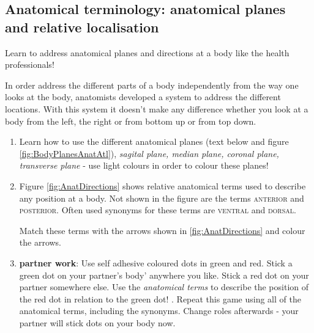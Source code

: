 \clearpage 	 \areaset[0cm]{16cm}{26.5cm} 
\subsection{Anatomical terminology: anatomical planes and relative localisation}\label{ssec:OrientierungKoerper}
 Learn to address anatomical planes and directions at a body like the health professionals! 
 
  In order address the different parts of a body independently from the way one looks at the body, anatomists developed a system to address the different locations. With this system it doesn't make any difference whether you look at a body from the left, the right or from bottom up or from top down.

	\begin{enumerate}[itemsep=1.5em, leftmargin=*]   
		\item Learn how to use the different anatomical planes (text below and figure \ref{fig:BodyPlanesAnatAtl}), \textit{sagital plane, median plane, coronal plane, transverse plane} - use light colours in order to colour these planes! 

		\item  Figure \ref{fig:AnatDirections} shows relative anatomical terms used to describe any position at a body. Not shown in the figure are the terms \textsc{anterior} and \textsc{posterior}. Often used synonyms for these terms are \textsc{ventral} and \textsc{dorsal}.
		
		Match these terms with the arrows shown in \ref{fig:AnatDirections} and colour the arrows. 
			
		\item \textbf{partner work}: Use self adhesive coloured dots in green and red. Stick a green dot on your partner's body' anywhere you like. Stick a red dot on your partner somewhere else. Use the \emph{anatomical terms} to describe the position of the red dot in relation to the green dot! . Repeat this game using all of the anatomical terms, including the synonyms. Change roles afterwards - your partner will stick dots on your body now.
	\end{enumerate}
	
				
\enlargethispage{2cm}
         \vspace{-4pt}

